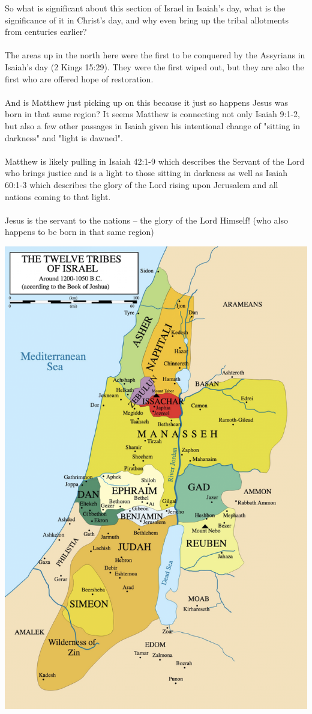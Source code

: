 \documentclass[11pt]{article}
\begin{document}
So what is significant about this section of Israel in Isaiah's day, what is the significance of it in Christ's day, and why even bring up the tribal allotments from centuries earlier?
\\\\
The areas up in the north here were the first to be conquered by the Assyrians in Isaiah's day (2 Kings 15:29). They were the first wiped out, but they are also the first who are offered hope of restoration.
\\\\
And is Matthew just picking up on this because it just so happens Jesus was born in that same region? It seems Matthew is connecting not only Isaiah 9:1-2, but also a few other passages in Isaiah given his intentional change of "sitting in darkness" and "light is dawned".
\\\\
Matthew is likely pulling in Isaiah 42:1-9 which describes the Servant of the Lord who brings justice and is a light to those sitting in darkness as well as Isaiah 60:1-3 which describes the glory of the Lord rising upon Jerusalem and all nations coming to that light.
\\\\
Jesus is the servant to the nations – the glory of the Lord Himself! (who also happens to be born in that same region)


\vspace{1em}
\begin{center}
\includegraphics[width=.75\textwidth]{image.png}
\end{center}
\vspace{1em}
\end{document}
